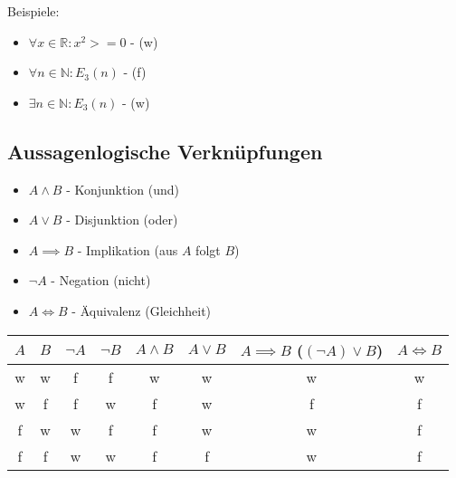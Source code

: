 \documentclass[12pt]{scrreprt}
\begin{document}
                Beispiele:
                \begin{itemize}
                    \item $ \forall x \in \mathbb{R} : x ^ 2 >= 0 $ - (w)
                    \item $ \forall n \in \mathbb{N} : E _ 3 (n) $ - (f)
                    \item $ \exists n \in \mathbb{N} : E _ 3 (n) $ - (w)
                \end{itemize}

            \subsection{Aussagenlogische Verknüpfungen}
                \begin{itemize}
                    \item $ A \land B $ - Konjunktion (und)
                    \item $ A \lor B $ - Disjunktion (oder)
                    \item $ A \implies B $ - Implikation (aus $ A $ folgt $ B $)
                    \item $ \lnot A $ - Negation (nicht)
                    \item $ A \iff B $ - Äquivalenz (Gleichheit)
                \end{itemize}

                \begin{tabular}{ c | c | c | c | c | c | c | c}
$ A $   & $ B $ & $ \lnot A $   & $ \lnot B $   & $ A \land B $ & $ A \lor B $  & $ A \implies B $ ($ (\lnot A) \lor B $)   & $ A \iff B $  \\
\hline
w       & w     & f             & f             & w             & w             & w                                         & w             \\
w       & f     & f             & w             & f             & w             & f                                         & f             \\
f       & w     & w             & f             & f             & w             & w                                         & f             \\
f       & f     & w             & w             & f             & f             & w                                         & f             \\
                \end{tabular}
\end{document}

